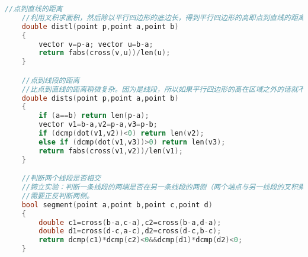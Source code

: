 \documentclass{article}
\begin{document}
\begin{lstlisting}[language={c}]
    //点到直线的距离
    //利用叉积求面积，然后除以平行四边形的底边长，得到平行四边形的高即点到直线的距离
    double distl(point p,point a,point b)
    {
    	vector v=p-a; vector u=b-a;
    	return fabs(cross(v,u))/len(u);
    }

    //点到线段的距离
    //比点到直线的距离稍微复杂。因为是线段，所以如果平行四边形的高在区域之外的话就不合理，这时候需要计算点到距离较近的端点的距离
    double dists(point p,point a,point b)
    {
	    if (a==b) return len(p-a);
	    vector v1=b-a,v2=p-a,v3=p-b;
	    if (dcmp(dot(v1,v2))<0) return len(v2);
	    else if (dcmp(dot(v1,v3))>0) return len(v3);
	    return fabs(cross(v1,v2))/len(v1);
    }

    //判断两个线段是否相交
    //跨立实验：判断一条线段的两端是否在另一条线段的两侧（两个端点与另一线段的叉积乘积为负）。
    //需要正反判断两侧。
    bool segment(point a,point b,point c,point d)
    {
	    double c1=cross(b-a,c-a),c2=cross(b-a,d-a);
	    double d1=cross(d-c,a-c),d2=cross(d-c,b-c);
	    return dcmp(c1)*dcmp(c2)<0&&dcmp(d1)*dcmp(d2)<0;
    }

\end{lstlisting}

\end{document}
